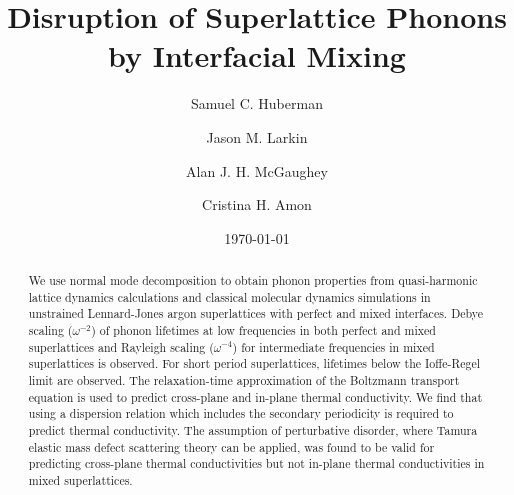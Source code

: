 \documentclass[aps,prb,preprint,preprintnumbers,amsmath,amssymb,floatfix,superscriptaddress]{revtex4}
\begin{document}
\title{Disruption of Superlattice Phonons by Interfacial Mixing}
\author{Samuel C. Huberman}
\author{Jason M. Larkin}
\author{Alan J. H. McGaughey}
\author{Cristina H. Amon}

\date{\today}%
\vspace{14mm}
  
\begin{abstract}

We use normal mode decomposition to obtain phonon properties from quasi-harmonic lattice dynamics calculations and classical molecular dynamics simulations in unstrained Lennard-Jones argon superlattices with perfect and mixed interfaces. Debye scaling ($\omega^{-2}$) of phonon lifetimes at low frequencies in both perfect and mixed superlattices and Rayleigh scaling ($\omega^{-4}$) for intermediate frequencies in mixed superlattices is observed. For short period superlattices, lifetimes below the Ioffe-Regel limit are observed. The relaxation-time approximation of the Boltzmann transport equation is used to predict cross-plane and in-plane thermal conductivity. We find that using a dispersion relation which includes the secondary periodicity is required to predict thermal conductivity. The assumption of perturbative disorder, where Tamura elastic mass defect scattering theory can be applied, was found to be valid for predicting cross-plane thermal conductivities but not in-plane thermal conductivities in mixed superlattices. 

\end{abstract}
\maketitle
\end{document}
